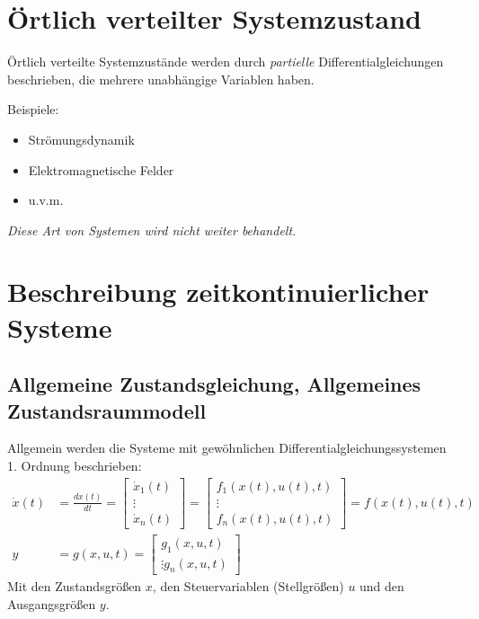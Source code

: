 	\section{Örtlich verteilter Systemzustand} %
		Örtlich verteilte Systemzustände werden durch \textit{partielle} Differentialgleichungen beschrieben, die mehrere unabhängige Variablen haben.

		Beispiele:
		\begin{itemize}
			\item Strömungsdynamik
			\item Elektromagnetische Felder
			\item u.v.m.
		\end{itemize}

		\textit{Diese Art von Systemen wird nicht weiter behandelt.}

	\section{Beschreibung zeitkontinuierlicher Systeme} %
		\subsection{Allgemeine Zustandsgleichung, Allgemeines Zustandsraummodell} %
			Allgemein werden die Systeme mit gewöhnlichen Differentialgleichungssystemen 1. Ordnung beschrieben:
			\begin{align*}
				\dot{x}(t) & = \frac{d x(t)}{dt} =
				\begin{bmatrix}
					\dot{x} _ 1 (t) \\
					\vdots          \\
					\dot{x} _ n (t)
				\end{bmatrix}
				=
				\begin{bmatrix}
					f _ 1 (x(t), u(t), t) \\
					\vdots                \\
					f _ n (x(t), u(t), t)
				\end{bmatrix}
				= f(x(t), u(t), t)                 \\
				y          & = g(x, u, t) =
				\begin{bmatrix}
					g _ 1 (x, u, t) \\
					\vdots
					g _ n (x, u, t)
				\end{bmatrix}
			\end{align*}
			Mit den Zustandsgrößen \(x\), den Steuervariablen (Stellgrößen) \(u\) und den Ausgangsgrößen \(y\).

